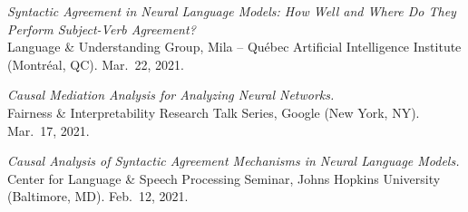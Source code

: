 \documentclass[10pt]{article}
\renewcommand{\section}[1]{\pagebreak[3]%
	\vspace{0.5\baselineskip}%
	\phantomsection\addcontentsline{toc}{section}{#1}%
	\noindent\llap{\bf\scshape\smash{\parbox[t]{\marginparwidth}{\hyphenpenalty=10000\raggedright \textcolor{black}{#1}}}}%
	\vspace{-\baselineskip}\par}
\newcommand{\halfblankline}{\quad\vspace{-0.5\baselineskip}\pagebreak[3]}
\begin{document}
	\emph{Syntactic Agreement in Neural Language Models: How Well and Where Do They Perform Subject-Verb Agreement?}\\Language \& Understanding Group, Mila -- Québec Artificial Intelligence Institute (Montréal, QC). Mar.\ 22, 2021.
	
	\halfblankline

	\emph{Causal Mediation Analysis for Analyzing Neural Networks.}\\Fairness \& Interpretability Research Talk Series, Google (New York, NY). Mar.\ 17, 2021.
	
	\halfblankline

	\emph{Causal Analysis of Syntactic Agreement Mechanisms in Neural Language Models.}\\Center for Language \& Speech Processing Seminar, Johns Hopkins University (Baltimore, MD). Feb.\ 12, 2021.
	
	\halfblankline




	
\end{document}

